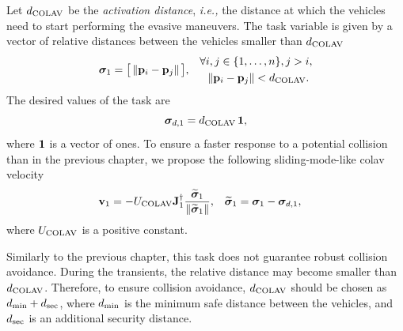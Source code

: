 Let {$d_{\rm COLAV}$} be the \emph{activation distance}, \emph{i.e.,} the distance at which the vehicles need to start performing the evasive maneuvers.
The task variable is given by a vector of relative distances between the vehicles smaller than $d_{\rm COLAV}$
\begin{align}
        \bm{\sigma}_1 &= \big[\left\|\mathbf{p}_i - \mathbf{p}_j\right\|\big], &
        \begin{split} 
            \forall &i,j\in\{1,\ldots,n\}, j > i, \\
            &\left\|\mathbf{p}_i - \mathbf{p}_j\right\| < d_{\rm COLAV}.
        \end{split}
\end{align}
The desired values of the task are 
\begin{equation}
    \bm{\sigma}_{d,1} = d_{\rm COLAV} \, \mathbf{1},
\end{equation}
where $\mathbf{1}$ is a vector of ones.
To ensure a faster response to a potential collision than in the previous chapter, we propose the following sliding-mode-like \gls{colav} velocity 
\begin{align}
    \mathbf{v}_1 &= - U_{\rm COLAV} \mathbf{J}_1^{\dagger} \frac{\widetilde{\bm{\sigma}}_1}{\left\|\widetilde{\bm{\sigma}}_1\right\|}, &
    \widetilde{\bm{\sigma}}_1 &= \bm{\sigma}_1 - \bm{\sigma}_{d, 1},
\end{align}
where $U_{\rm COLAV}$ is a positive constant.

Similarly to the previous chapter, this task does not guarantee robust collision avoidance.
During the transients, the relative distance may become smaller than $d_{\rm COLAV}$.
Therefore, to ensure collision avoidance, $d_{\rm COLAV}$ should be chosen as $d_{\rm min} + d_{\rm sec}$, where $d_{\rm min}$ is the minimum safe distance between the vehicles, and $d_{\rm sec}$ is an additional security distance.

